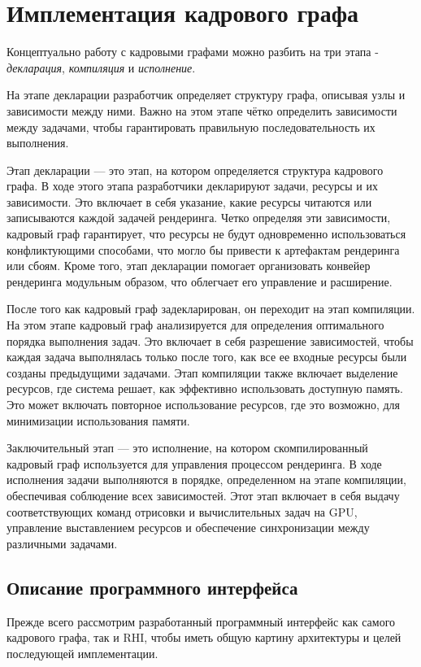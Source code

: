 \section{Имплементация кадрового графа}
Концептуально работу с кадровыми графами можно разбить на три этапа - \textit{декларация}, \textit{компиляция} и \textit{исполнение}.

На этапе декларации разработчик определяет структуру графа, описывая узлы и зависимости между ними. Важно на этом этапе чётко определить зависимости между задачами, чтобы гарантировать правильную последовательность их выполнения.

Этап декларации — это этап, на котором определяется структура кадрового графа. В ходе этого этапа разработчики декларируют задачи, ресурсы и их зависимости. Это включает в себя указание, какие ресурсы читаются или записываются каждой задачей рендеринга. Четко определяя эти зависимости, кадровый граф гарантирует, что ресурсы не будут одновременно использоваться конфликтующими способами, что могло бы привести к артефактам рендеринга или сбоям. Кроме того, этап декларации помогает организовать конвейер рендеринга модульным образом, что облегчает его управление и расширение.

После того как кадровый граф задекларирован, он переходит на этап компиляции. На этом этапе кадровый граф анализируется для определения оптимального порядка выполнения задач. Это включает в себя разрешение зависимостей, чтобы каждая задача выполнялась только после того, как все ее входные ресурсы были созданы предыдущими задачами. Этап компиляции также включает выделение ресурсов, где система решает, как эффективно использовать доступную память. Это может включать повторное использование ресурсов, где это возможно, для минимизации использования памяти.

Заключительный этап — это исполнение, на котором скомпилированный кадровый граф используется для управления процессом рендеринга. В ходе исполнения задачи выполняются в порядке, определенном на этапе компиляции, обеспечивая соблюдение всех зависимостей. Этот этап включает в себя выдачу соответствующих команд отрисовки и вычислительных задач на GPU, управление выставлением ресурсов и обеспечение синхронизации между различными задачами.

\subsection{Описание программного интерфейса}
Прежде всего рассмотрим разработанный программный интерфейс как самого кадрового графа, так и RHI, чтобы иметь общую картину архитектуры и целей последующей имплементации.


